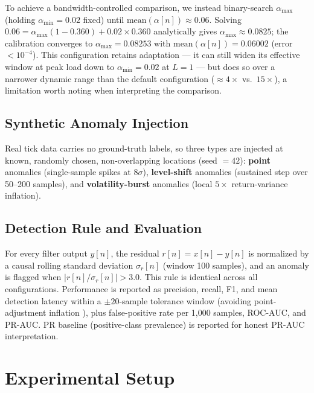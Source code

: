 \documentclass[conference]{IEEEtran}
\begin{document}
To achieve a bandwidth-controlled comparison, we instead binary-search
$\alpha_\text{max}$ (holding $\alpha_\text{min}=0.02$ fixed) until
$\text{mean}(\alpha[n])\approx0.06$. Solving
$0.06 = \alpha_\text{max}(1-0.360)+0.02\times0.360$ analytically gives
$\alpha_\text{max}\approx0.0825$; the calibration converges to
$\alpha_\text{max}=0.08253$ with $\text{mean}(\alpha[n])=0.06002$
(error $<10^{-4}$). This configuration retains adaptation — it can still
widen its effective window at peak load down to $\alpha_\text{min}=0.02$
at $L=1$ — but does so over a narrower dynamic range than the default
configuration ($\approx4\times$ vs.\ $15\times$), a limitation worth
noting when interpreting the comparison.

\subsection{Synthetic Anomaly Injection}
Real tick data carries no ground-truth labels, so three types are injected
at known, randomly chosen, non-overlapping locations (seed $=42$): \textbf{point}
anomalies (single-sample spikes at $8\sigma$), \textbf{level-shift} anomalies
(sustained step over 50--200 samples), and \textbf{volatility-burst} anomalies
(local $5\times$ return-variance inflation).

\subsection{Detection Rule and Evaluation}
For every filter output $y[n]$, the residual $r[n]=x[n]-y[n]$ is normalized
by a causal rolling standard deviation $\sigma_r[n]$ (window 100 samples),
and an anomaly is flagged when $|r[n]/\sigma_r[n]|>3.0$. This rule is
identical across all configurations. Performance is reported as precision,
recall, F1, and mean detection latency within a $\pm20$-sample tolerance
window (avoiding point-adjustment inflation \cite{tsad_eval}), plus
false-positive rate per 1,000 samples, ROC-AUC, and PR-AUC. PR baseline
(positive-class prevalence) is reported for honest PR-AUC interpretation.

\section{Experimental Setup}
\end{document}
